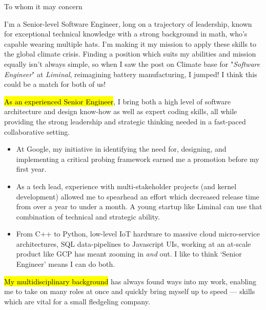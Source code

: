\documentclass{tc_cv}
\begin{document}

\begin{adjustwidth}{38pt}{38pt}

  To whom it may concern\par \bigskip

  I'm a Senior-level Software Engineer, long on a trajectory of leadership,
  known for exceptional technical knowledge with a strong background in math,
  who's capable wearing multiple hats. I'm making it my mission to apply these
  skills to the global climate crisis. Finding a position which suits my
  abilities and mission equally isn't always simple, so when I saw the post on
  Climate base for "\emph{Software Engineer}" at \emph{Liminal}, reimagining
  battery manufacturing, I jumped! I think this could be a match for both of
  us! \medskip

  \hl{As an experienced Senior Engineer}, I bring both a high level of software
  architecture and design know-how as well as expert coding skills, all while
  providing the strong leadership and strategic thinking needed in a fast-paced
  collaborative setting.
  \begin{itemize}

    \item At Google, my initiative in identifying the need for, designing, and
      implementing a critical probing framework earned me a promotion before my
      first year.

    \item As a tech lead, experience with multi-stakeholder projects (and
      kernel development) allowed me to spearhead an effort which decreased
      release time from over a year to under a month. A young startup like
      Liminal can use that combination of technical and strategic ability.

    \item From C++ to Python, low-level IoT hardware to massive cloud
      micro-service architectures, SQL data-pipelines to Javascript UIs,
      working at an at-scale product like GCP has meant zooming in \emph{and}
      out. I like to think `Senior Engineer' means I can do both.

  \end{itemize} \medskip

  \hl{My multidisciplinary background} has always found ways into my work,
  enabling me to take on many roles at once and quickly bring myself up to
  speed --- skills which are vital for a small fledgeling company.
  \begin{itemize}


\end{itemize}
\end{adjustwidth}
\end{document}
